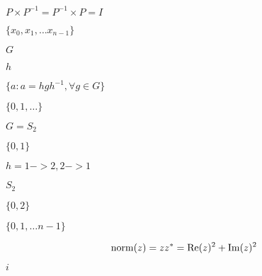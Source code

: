 \documentclass{article}
\begin{document}
$ P \times P^{-1} = P^{-1} \times P = I $
\pagebreak

$ \{x_0, x_1, \dots x_{n-1}\} $
\pagebreak

$ G $
\pagebreak

$ h $
\pagebreak

$ \{ a: a = h g h^{-1}, \forall g \in G \} $
\pagebreak

$ \{ 0, 1, \dots \} $
\pagebreak

$ G = S_2 $
\pagebreak

$ \{0,1\} $
\pagebreak

$ h = {1->2, 2->1} $
\pagebreak

$ S_2 $
\pagebreak

$ \{0,2\} $
\pagebreak

$ \{0, 1, \dots n-1\} $
\pagebreak

\[ {\rm norm}(z) = zz^* = {\rm Re}(z)^2 + {\rm Im}(z)^2 \]
\pagebreak

$i$
\pagebreak
\end{document}
